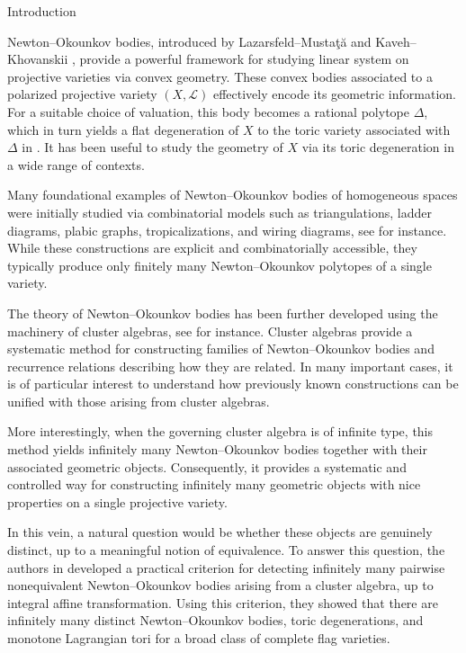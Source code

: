 \documentclass[11pt]{amsart}
\makeatletter
\def\section{\@startsection{section}{1}%
  \z@{-1.2\linespacing\@plus-.5\linespacing}{.8\linespacing}%
  {\normalfont\bfseries\large}}
\numberwithin{equation}{section}
\theoremstyle{plain}
\theoremstyle{definition}
\numberwithin{equation}{section}
\makeatother
\begin{document}
\section{Introduction}\label{secIntroduction}

Newton--Okounkov bodies, introduced by Lazarsfeld--Musta\c{t}\u{a} \cite{LM09} and Kaveh--Khovanskii \cite{KK12}, provide a powerful framework for studying linear system on projective varieties via convex geometry. These convex bodies associated to a polarized projective variety $(X,\mathcal{L})$ effectively encode its geometric information. For a suitable choice of valuation, this body becomes a rational polytope $\Delta$, which in turn yields a flat degeneration of $X$ to the toric variety associated with $\Delta$ in \cite{And13}. It has been useful to study the geometry of $X$ via its toric degeneration in a wide range of contexts.

Many foundational examples of Newton--Okounkov bodies of homogeneous spaces were initially studied via combinatorial models such as triangulations, ladder diagrams, plabic graphs, tropicalizations, and wiring diagrams, see \cite{GonciuleaLakshmibai, GP00b, Cal02, AB04, KoganMiller, SS04, Kav15, RW19, CMZ24} for instance. While these constructions are explicit and combinatorially accessible, they typically produce only finitely many Newton--Okounkov polytopes of a single variety.

The theory of Newton--Okounkov bodies has been further developed using the machinery of cluster algebras, see \cite{GHKK18, RW19, BFMN20, FH21, EH22, BCMN24, FO25} for instance. Cluster algebras provide a systematic method for constructing families of Newton--Okounkov bodies and recurrence relations describing how they are related. In many important cases, it is of particular interest to understand how previously known constructions can be unified with those arising from cluster algebras.

More interestingly, when the governing cluster algebra is of infinite type, this method yields infinitely many Newton--Okounkov bodies together with their associated geometric objects. Consequently, it provides a systematic and controlled way for constructing infinitely many geometric objects with nice properties on a single projective variety.

In this vein, a natural question would be whether these objects are genuinely distinct, up to a meaningful notion of equivalence. To answer this question, the authors in \cite{CKKP25} developed a practical criterion for detecting infinitely many pairwise nonequivalent Newton--Okounkov bodies arising from a cluster algebra, up to integral affine transformation. Using this criterion, they showed that there are infinitely many distinct Newton--Okounkov bodies, toric degenerations, and monotone Lagrangian tori for a broad class of complete flag varieties.
\end{document}
